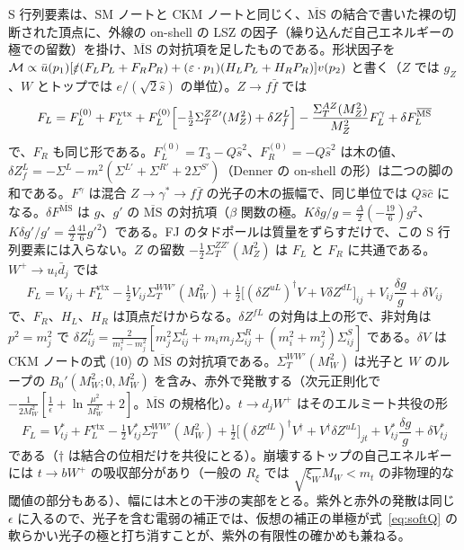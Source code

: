 \documentclass[a4paper,10pt]{ltjsarticle}
\newcommand{\MSbar}{\overline{\mathrm{MS}}}
\begin{document}
S 行列要素は、SM ノートと CKM ノートと同じく、$\MSbar$ の結合で書いた裸の切断された頂点に、外線の on-shell の LSZ の因子（繰り込んだ自己エネルギーの極での留数）を掛け、$\MSbar$ の対抗項を足したものである。形状因子を
$\mathcal M\propto\bar u(p_1)[\slashed\varepsilon(F_LP_L+F_RP_R)+(\varepsilon\cdot p_1)(H_LP_L+H_RP_R)]v(p_2)$ と書く（$Z$ では $g_Z$、$W$ とトップでは $e/(\sqrt2\hat s)$ の単位）。$Z\to f\bar f$ では
\begin{equation}
F_L=F_L^{(0)}+F_L^{\mathrm{vtx}}+F_L^{(0)}\Bigl[-\tfrac12\Sigma^{ZZ\prime}_T(M_Z^2)+\delta Z^L_f\Bigr]-\frac{\Sigma^{AZ}_T(M_Z^2)}{M_Z^2}F_L^{\gamma}+\delta F_L^{\MSbar}
\label{eq:zren}
\end{equation}
で、$F_R$ も同じ形である。$F^{(0)}_L=T_3-Q\hat s^2$、$F^{(0)}_R=-Q\hat s^2$ は木の値、$\delta Z^L_f=-\Sigma^L-m^2(\Sigma^{L\prime}+\Sigma^{R\prime}+2\Sigma^{S\prime})$（Denner の on-shell の形）は二つの脚の和である。$F^\gamma$ は混合 $Z\to\gamma^*\to f\bar f$ の光子の木の振幅で、同じ単位では $Q\hat s\hat c$ になる。$\delta F^{\MSbar}$ は $g$、$g'$ の $\MSbar$ の対抗項（$\beta$ 関数の極。$K\delta g/g=\frac\Delta2(-\frac{19}6)g^2$、$K\delta g'/g'=\frac\Delta2\frac{41}6g'^2$）である。FJ のタドポールは質量をずらすだけで、この S 行列要素には入らない。$Z$ の留数 $-\frac12\Sigma^{ZZ\prime}_T(M_Z^2)$ は $F_L$ と $F_R$ に共通である。$W^+\to u_i\bar d_j$ では
\begin{equation}
F_L=V_{ij}+F_L^{\mathrm{vtx}}-\tfrac12V_{ij}\Sigma^{WW\prime}_T(M_W^2)+\tfrac12\bigl[(\delta Z^{uL})^\dagger V+V\delta Z^{dL}\bigr]_{ij}+V_{ij}\frac{\delta g}g+\delta V_{ij}
\label{eq:wren}
\end{equation}
で、$F_R$、$H_L$、$H_R$ は頂点だけからなる。$\delta Z^{fL}$ の対角は上の形で、非対角は $p^2=m_j^2$ で $\delta Z^L_{ij}=\frac2{m_i^2-m_j^2}[m_j^2\Sigma^L_{ij}+m_im_j\Sigma^R_{ij}+(m_i^2+m_j^2)\Sigma^S_{ij}]$ である。$\delta V$ は CKM ノートの式 (10) の $\MSbar$ の対抗項である。$\Sigma^{WW\prime}_T(M_W^2)$ は光子と $W$ のループの $B_0'(M_W^2;0,M_W^2)$ を含み、赤外で発散する（次元正則化で $-\frac1{2M_W^2}[\frac1\epsilon+\ln\frac{\mu^2}{M_W^2}+2]$。$\MSbar$ の規格化）。$t\to d_jW^+$ はそのエルミート共役の形
\begin{equation}
F_L=V^*_{tj}+F_L^{\mathrm{vtx}}-\tfrac12V^*_{tj}\Sigma^{WW\prime}_T(M_W^2)+\tfrac12\bigl[(\delta Z^{dL})^\dagger V^\dagger+V^\dagger\delta Z^{uL}\bigr]_{jt}+V^*_{tj}\frac{\delta g}g+\delta V^*_{tj}
\label{eq:tren}
\end{equation}
である（$\dagger$ は結合の位相だけを共役にとる）。崩壊するトップの自己エネルギーには $t\to bW^+$ の吸収部分があり（一般の $R_\xi$ では $\sqrt{\xi_W}M_W<m_t$ の非物理的な閾値の部分もある）、幅には木との干渉の実部をとる。紫外と赤外の発散は同じ $\epsilon$ に入るので、光子を含む電弱の補正では、仮想の補正の単極が式~\eqref{eq:softQ} の軟らかい光子の極と打ち消すことが、紫外の有限性の確かめも兼ねる。
\end{document}
